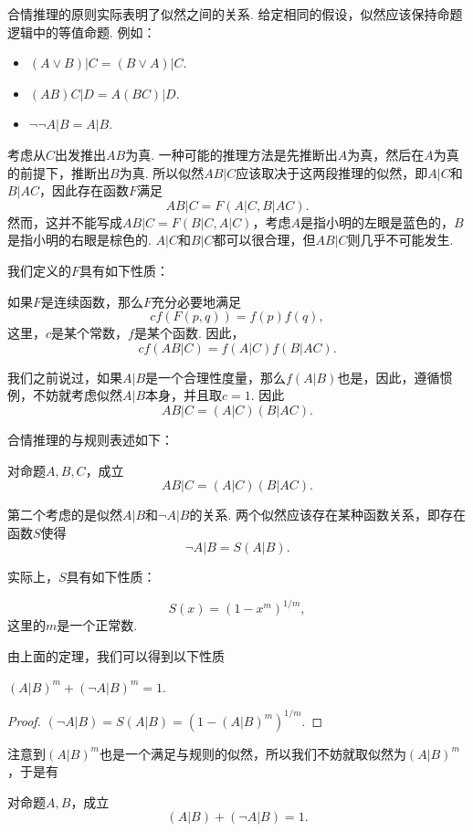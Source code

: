 合情推理的原则实际表明了似然之间的关系. 给定相同的假设，似然应该保持命题逻辑中的等值命题. 例如：
    \begin{itemize}
        \item $(A\vee B) | C=(B\vee A) | C$.
        \item $(AB)C|D=A(BC)|D$.
        \item $\neg\neg A|B=A|B$.
    \end{itemize}

考虑从$C$出发推出$AB$为真. 一种可能的推理方法是先推断出$A$为真，然后在$A$为真的前提下，推断出$B$为真. 所以似然$AB|C$应该取决于这两段推理的似然，即$A|C$和$B|AC$，因此存在函数$F$满足
    \[
        AB|C=F(A|C,B|AC).
    \]
然而，这并不能写成$AB|C = F(B|C, A|C)$，考虑$A$是指小明的左眼是蓝色的，$B$是指小明的右眼是棕色的. $A|C$和$B|C$都可以很合理，但$AB|C$则几乎不可能发生.

我们定义的$F$具有如下性质：
\begin{theorem}
    如果$F$是连续函数，那么$F$充分必要地满足
        \[cf(F(p,q))=f(p)f(q),\]
        这里，$c$是某个常数，$f$是某个函数.
        因此，
        \[cf(AB|C)=f(A|C)f(B|AC).\]
    \end{theorem}

我们之前说过，如果$A|B$是一个合理性度量，那么$f(A|B)$也是，因此，遵循惯例，不妨就考虑似然$A|B$本身，并且取$c=1$. 因此
        \[AB|C=(A|C)(B|AC).\]

合情推理的与规则表述如下：
\begin{principle}[与规则]
对命题$A,B,C$，成立
\[AB|C=(A|C)(B|AC).\]
\end{principle}

第二个考虑的是似然$A|B$和$\neg A|B$的关系. 两个似然应该存在某种函数关系，即存在函数$S$使得
    \[\neg A|B=S(A|B).\]

实际上，$S$具有如下性质：
\begin{theorem}
    \begin{equation*}
        S(x) = (1 - x^m)^{1/m},
    \end{equation*}
    这里的$m$是一个正常数.
\end{theorem}

由上面的定理，我们可以得到以下性质
\begin{corollary}
    $(A|B)^m + (\neg A|B)^m = 1$.
\end{corollary}
\begin{proof}
    $(\neg A|B) = S(A|B) = (1 - (A|B)^m)^{1/m}$.
\end{proof}

注意到$(A|B)^m$也是一个满足与规则的似然，所以我们不妨就取似然为$(A|B)^m$，于是有
\begin{principle}[否定规则]
对命题$A,B$，成立
\[(A|B) + (\neg A|B) = 1.\]
\end{principle}

